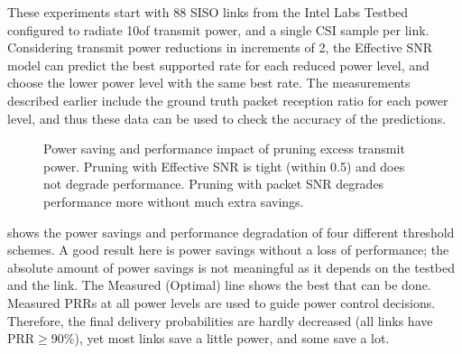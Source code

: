 These experiments start with 88 SISO links from the Intel Labs Testbed configured to radiate 10\mW of transmit power, and a single CSI sample per link. Considering transmit power reductions in increments of 2\dB, the Effective SNR model can predict the best supported rate for each reduced power level, and choose the lower power level with the same best rate. The measurements described earlier include the ground truth packet reception ratio for each power level, and thus these data can be used to check the accuracy of the predictions.

\begin{figure}[t]
      \centering
      \caption[Impact of pruning excess transmit power]{\label{fig:power_save_1x1} Power saving and performance impact of pruning excess transmit power. Pruning with Effective SNR is tight (within 0.5\dB) and does not degrade performance. Pruning with packet SNR degrades performance more without much extra savings.} 
\end{figure}


 shows the power savings and performance degradation of four different threshold schemes. A good result here is power savings without a loss of performance; the absolute amount of power savings is not meaningful as it depends on the testbed and the link. The Measured (Optimal) line shows the best that can be done. Measured PRRs at all power levels are used to guide power control decisions. Therefore, the final delivery probabilities are hardly decreased (all links have PRR$\geq$90\%), yet most links save a little power, and some save a lot.

